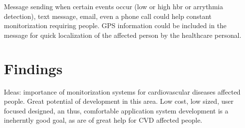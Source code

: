 		Message sending when certain events occur (low or high hbr or arrythmia detection), text message, email, even a phone call could help constant monitorization requiring people. GPS information could be included in the message for quick localization of the affected person by the healthcare personal.

	
	\section{Findings}

		Ideas: importance of monitorization systems for cardiovascular diseases affected people. Great potential of development in this area. Low cost, low sized, user focused designed, an thus, comfortable application system development is a ineherntly good goal, as are of great help for CVD affected people.